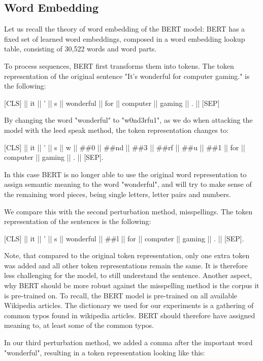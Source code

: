 \subsection{Word Embedding}
Let us recall the theory of word embedding of the BERT model:
BERT has a fixed set of learned word embeddings, composed in a word embedding lookup table, consisting of 30,522 words and word parts. 

To process sequences, BERT first transforms them into tokens. The token representation of the original sentence "It’s wonderful for computer gaming." is the following:


{[}CLS{]}  ||  it  ||  '  ||  s  ||  wonderful  ||  for  ||  computer  ||  gaming  ||  .  ||  {[}SEP{]} 


By changing the word "wonderful" to "w0nd3rfu1", as we do when attacking the model with the leed speak method, the token representation changes to:

{[}CLS{]}  ||  it  ||  '  ||  s  ||  w  ||  \#\#0  ||  \#\#nd  ||  \#\#3  ||  \#\#rf  ||  \#\#u  ||  \#\#1  ||  for  ||  computer  ||  gaming  ||  .  ||  {[}SEP{]}.

In this case BERT is no longer able to use the original word representation to assign semantic meaning to the word "wonderful", and will try to make sense of the remaining word pieces, being single letters, letter pairs and numbers.

We compare this with the second perturbation method, misspellings. The token representation of the sentences is the following:

{[}CLS{]}  ||  it  ||  '  ||  s  ||  wonderful  ||  \#\#l  ||  for  ||  computer  ||  gaming  ||  .  ||  {[}SEP{]}.

Note, that compared to the original token representation, only one extra token was added and all other token representations remain the same. It is therefore less challenging for the model, to still understand the sentence. Another aspect, why BERT should be more robust against the misspelling method is the corpus it is pre-trained on. To recall, the BERT model is pre-trained on all available Wikipedia articles. The dictionary we used for our experiments is a gathering of common typos found in wikipedia articles. BERT should therefore have assigned meaning to, at least some of the common typos.


In our third perturbation method, we added a comma after the important word "wonderful", resulting in a token representation looking like this:

